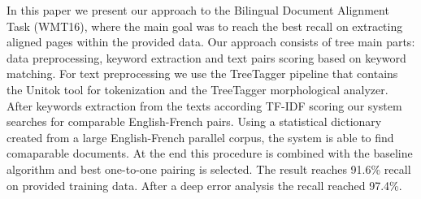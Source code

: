 In this paper we present our approach to the Bilingual Document Alignment Task (WMT16), where the main goal was to reach the best recall on extracting aligned pages within the provided data. Our approach consists of tree main parts: data preprocessing, keyword extraction and text pairs scoring based on keyword matching. For text preprocessing we use the TreeTagger pipeline that contains the Unitok tool for tokenization and the TreeTagger morphological analyzer. After keywords extraction from the texts according TF-IDF scoring our system searches for comparable English-French pairs. Using a statistical dictionary created from a large English-French parallel corpus, the system is able to find comaparable documents. At the end this procedure is combined with the baseline algorithm and best one-to-one pairing is selected. The result reaches 91.6\% recall on provided training data. After a deep error analysis the recall reached 97.4\%.
